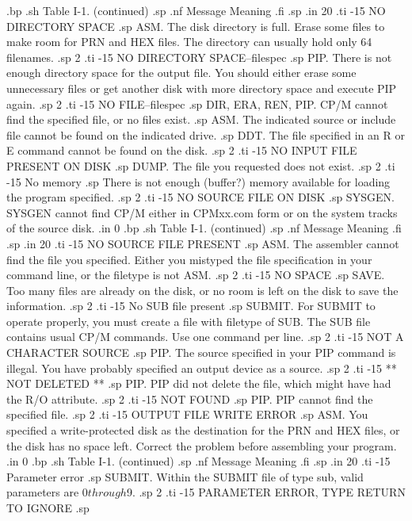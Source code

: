 .bp
.sh
                     Table I-1.  (continued)
.sp
.nf
     Message        Meaning
.fi
.sp
.in 20
.ti -15
NO DIRECTORY SPACE
.sp
ASM.  The disk directory is full.  Erase some files to make room 
for PRN and HEX files.  The directory can usually hold only 64 
filenames.
.sp 2
.ti -15
NO DIRECTORY SPACE--{filespec}
.sp
PIP.  There is not enough directory space for the output file.  
You should either erase some unnecessary files or get another 
disk with more directory space and execute PIP again.
.sp 2
.ti -15
NO FILE--{filespec}
.sp
DIR, ERA, REN, PIP.  CP/M cannot find the specified file, or no 
files exist.
.sp
ASM.  The indicated source or include file cannot be found on the 
indicated drive.
.sp
DDT.  The file specified in an R or E command cannot be found on 
the disk.
.sp 2
.ti -15
NO INPUT FILE PRESENT ON DISK
.sp
DUMP.  The file you requested does not exist.
.sp 2
.ti -15
No memory
.sp
There is not enough (buffer?) memory available for loading the 
program specified.
.sp 2
.ti -15
NO SOURCE FILE ON DISK
.sp
SYSGEN.  SYSGEN cannot find CP/M either in CPMxx.com form or on 
the system tracks of the source disk.
.in 0
.bp
.sh
                     Table I-1.  (continued)
.sp
.nf
     Message        Meaning
.fi
.sp
.in 20
.ti -15
NO SOURCE FILE PRESENT
.sp
ASM.  The assembler cannot find the file you specified.  Either 
you mistyped the file specification in your command line, or the 
filetype is not ASM.
.sp 2
.ti -15
NO SPACE
.sp
SAVE.  Too many files are already on the disk, or no room is left 
on the disk to save the information.
.sp 2
.ti -15
No SUB file present
.sp
SUBMIT.  For SUBMIT to operate properly, you must create a file 
with filetype of SUB.  The SUB file contains usual CP/M commands.  
Use one command per line.
.sp 2
.ti -15
NOT A CHARACTER SOURCE
.sp
PIP.  The source specified in your PIP command is illegal.  You 
have probably specified an output device as a source.
.sp 2
.ti -15
** NOT DELETED **
.sp
PIP.  PIP did not delete the file, which might have had the R/O 
attribute.
.sp 2
.ti -15
NOT FOUND
.sp
PIP.  PIP cannot find the specified file.
.sp 2
.ti -15
OUTPUT FILE WRITE ERROR
.sp
ASM.  You specified a write-protected disk as the destination for 
the PRN and HEX files, or the disk has no space left.  Correct 
the problem before assembling your program.
.in 0
.bp
.sh
                     Table I-1.  (continued)
.sp
.nf
     Message        Meaning
.fi
.sp
.in 20
.ti -15
Parameter error
.sp
SUBMIT.  Within the SUBMIT file of type sub, valid parameters are 
$0 through $9.
.sp 2
.ti -15
PARAMETER ERROR, TYPE RETURN TO IGNORE
.sp
